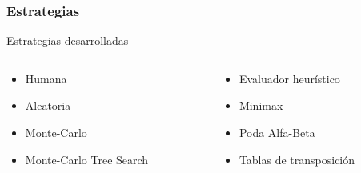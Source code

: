 \documentclass[10pt]{beamer}
\begin{document}
\begin{frame}[squeeze]
\frametitle{Estrategias}
%
%

\begin{exampleblock}{Estrategias desarrolladas}
{\footnotesize
\begin{columns}
\begin{column}{0.4\linewidth}
\begin{itemize}
\item Humana
\item Aleatoria
\item Monte-Carlo
\item Monte-Carlo Tree Search
\end{itemize}
\end{column}
\begin{column}{0.4\linewidth}
\begin{itemize}
\item Evaluador heurístico
\item Minimax
\item Poda Alfa-Beta
\item Tablas de transposición
\end{itemize}
\end{column}
\end{columns}
}
\end{exampleblock}


\end{frame}
\end{document}
